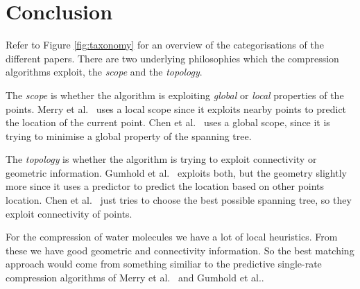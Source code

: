 \documentclass[11pt,twocolumn]{article}
\begin{document}
\section{Conclusion}

Refer to Figure \ref{fig:taxonomy} for an overview of the categorisations of
the different papers. There are two underlying philosophies which the
compression algorithms exploit, the \emph{scope} and the \emph{topology}.

The \emph{scope} is whether the algorithm is exploiting \emph{global} or
\emph{local} properties of the points. Merry et al.~\cite{merrycomp} uses a
local scope since it exploits nearby points to predict the location of the
current point. Chen et al.~\cite{chen2005lcp} uses a global scope, since it is
trying to minimise a global property of the spanning tree.

The \emph{topology} is whether the algorithm is trying to exploit connectivity
or geometric information. Gumhold et al.~\cite{gumholdcomp} exploits both, but
the geometry slightly more since it uses a predictor to predict the location
based on other points location. Chen et al.~\cite{chen2005lcp} just tries to
choose the best possible spanning tree, so they exploit connectivity of
points.

For the compression of water molecules we have a lot of local heuristics. From
these we have good geometric and connectivity information. So the best
matching approach would come from something similiar to the predictive
single-rate compression algorithms of Merry et al.~\cite{merrycomp} and
Gumhold et al.\cite{gumholdcomp}.
\end{document}
